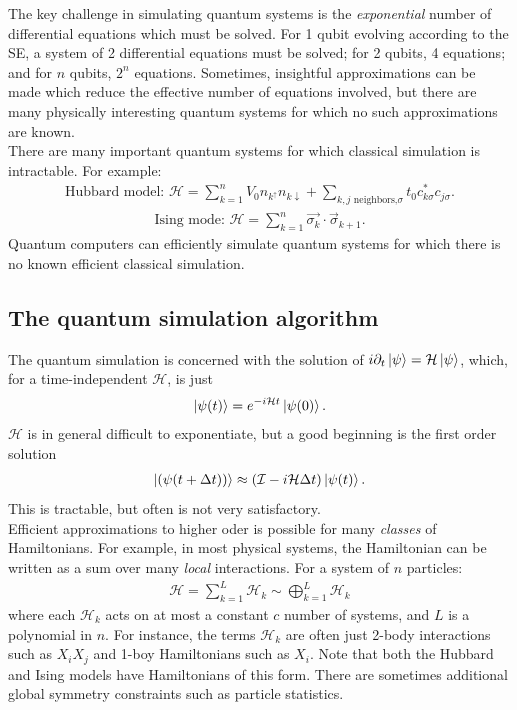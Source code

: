 \documentclass{book}
\theoremstyle{definition}
\newcommand{\p}{\partial}
\newcommand{\had}{\mathcal{H}}
\newcommand{\Id}{\mathcal{I}}
\begin{document}
The key challenge in simulating quantum systems is the \textit{exponential} number of differential equations which must be solved. For 1 qubit evolving according to the
SE, a system of 2 differential equations must be solved; for 2
qubits, 4 equations; and for $n$ qubits, $2^n$ equations. Sometimes, insightful approximations can be made which reduce the effective number of equations involved, but there are many physically interesting quantum systems for which no such approximations are known.
\\

There are many important quantum systems for which classical simulation is intractable. For example:
\begin{align}
\mbox{Hubbard model: } \had = \sum^n_{k=1}V_0 n_{k^\uparrow}n_{k\downarrow} + \sum_{k,j\mbox{ neighbors,}\sigma} t_0 c_{k\sigma}^* c_{j\sigma}.
\end{align}
\begin{align}
\mbox{Ising mode: } \had = \sum_{k=1}^n \vec{\sigma_k}\cdot \vec{\sigma}_{k+1} .
\end{align}
Quantum computers can efficiently simulate quantum systems for which there is no known efficient classical simulation.












\subsection{The quantum simulation algorithm}

The quantum simulation is concerned with the solution of $i \p_t \ket{\psi} = \had \ket{\psi}$, which, for a time-independent $\had$, is just
\begin{align}
\ket{\psi(t)} = e^{-i\had t}\ket{\psi(0)}.
\end{align}
$\had$ is in general difficult to exponentiate, but a good beginning is the first order solution 
\begin{align}
\ket{(\psi(t+\Delta t))} \approx (\Id - i\had \Delta t)\ket{\psi(t)}.
\end{align}
This is tractable, but often is not very satisfactory. \\

Efficient approximations to higher oder is possible for many \textit{classes} of Hamiltonians. For example, in most physical systems, the Hamiltonian can be written as a sum over many \textit{local} interactions. For a system of $n$ particles:
\begin{align}
\had = \sum^L_{k=1}\had_k \sim \bigoplus^L_{k=1}\had_k
\end{align} 
where each $\had_k$ acts on at most a constant $c$ number of systems, and $L$ is a polynomial in $n$. For instance, the terms $\had_k$ are often just 2-body interactions such as $X_i X_j$ and 1-boy Hamiltonians such as $X_i$. Note that both the Hubbard and Ising models have Hamiltonians of this form. There are sometimes additional global symmetry constraints such as particle statistics.\\
\end{document}
